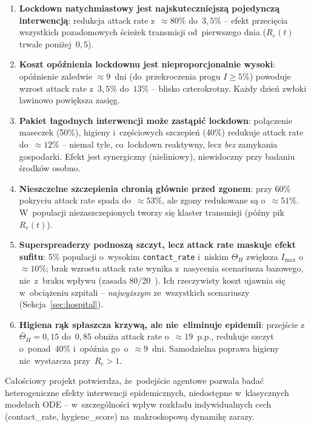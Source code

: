 \documentclass[polish]{projectreport}
\begin{document}
\begin{enumerate}
  \item \textbf{Lockdown natychmiastowy jest najskuteczniejszą pojedynczą
        interwencją}: redukcja attack rate z~$\approx 80\%$ do~$3{,}5\%$ --
        efekt przecięcia wszystkich pozadomowych ścieżek transmisji
        od~pierwszego dnia ($R_e(t)$ trwale poniżej~$0{,}5$).
  \item \textbf{Koszt opóźnienia lockdownu jest nieproporcjonalnie wysoki}:
        opóźnienie zaledwie $\approx 9$~dni (do~przekroczenia progu $I \geq 5\%$)
        powoduje wzrost attack rate z~$3{,}5\%$ do~$13\%$ -- blisko czterokrotny.
        Każdy dzień zwłoki lawinowo powiększa zasięg.
  \item \textbf{Pakiet łagodnych interwencji może zastąpić lockdown}:
        połączenie maseczek (50\%), higieny i~częściowych szczepień (40\%)
        redukuje attack rate do~$\approx 12\%$ -- niemal tyle, co~lockdown
        reaktywny, lecz \emph{bez} zamykania gospodarki. Efekt jest
        synergiczny (nieliniowy), niewidoczny przy badaniu środków osobno.
  \item \textbf{Nieszczelne szczepienia chronią głównie przed zgonem}:
        przy 60\% pokryciu attack rate spada do~$\approx 53\%$,
        ale zgony redukowane są o~$\approx 51\%$. W~populacji niezaszczepionych
        tworzy się klaster transmisji (późny pik $R_e(t)$).
  \item \textbf{Superspreaderzy podnoszą szczyt, lecz attack rate maskuje
        efekt sufitu}: 5\% populacji o~wysokim \texttt{contact\_rate} i~niskim
        $\Theta_H$ zwiększa $I_{\max}$ o~$\approx 10\%$; brak wzrostu attack rate
        wynika z~nasycenia scenariusza bazowego, nie~z~braku wpływu
        (zasada 80/20~\cite{lloyd2001realistic}). Ich rzeczywisty koszt
        ujawnia się w~obciążeniu szpitali -- \emph{najwyższym} ze~wszystkich
        scenariuszy (Sekcja~\ref{sec:hospital}).
  \item \textbf{Higiena rąk spłaszcza krzywą, ale nie~eliminuje epidemii}:
        przejście z~$\bar{\Theta}_H = 0{,}15$ do~$0{,}85$ obniża attack rate
        o~$\approx 19$~p.p., redukuje szczyt o~ponad~40\% i~opóźnia go~o~$\approx 9$~dni.
        Samodzielna poprawa higieny nie~wystarcza przy~$R_e > 1$.
\end{enumerate}

Całościowy projekt potwierdza, że~podejście agentowe pozwala badać
heterogeniczne efekty interwencji epidemicznych, niedostępne w~klasycznych
modelach ODE -- w~szczególności wpływ rozkładu indywidualnych cech
(contact\_rate, hygiene\_score) na~makroskopową dynamikę zarazy.

\printbibliography

\end{document}
